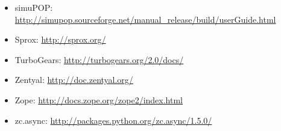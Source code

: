 \documentclass[letterpaper,10pt,english]{sphinxmanual}
\begin{document}
\begin{itemize}
\item {} 
simuPOP:
\url{http://simupop.sourceforge.net/manual\_release/build/userGuide.html}

\item {} 
Sprox: \url{http://sprox.org/}

\item {} 
TurboGears: \url{http://turbogears.org/2.0/docs/}

\item {} 
Zentyal: \url{http://doc.zentyal.org/}

\item {} 
Zope: \url{http://docs.zope.org/zope2/index.html}

\item {} 
zc.async: \url{http://packages.python.org/zc.async/1.5.0/}

\end{itemize}
\end{document}
